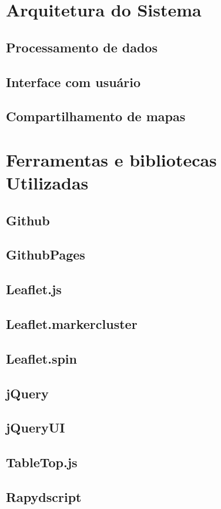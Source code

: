 \section{Arquitetura do Sistema}
\subsection{Processamento de dados}
\subsection{Interface com usuário} 
\subsection{Compartilhamento de mapas}

\section{Ferramentas e bibliotecas Utilizadas}
\subsection{Github}
\subsection{GithubPages}

\subsection{Leaflet.js}
\subsection{Leaflet.markercluster}
\subsection{Leaflet.spin}

\subsection{jQuery}
\subsection{jQueryUI}

\subsection{TableTop.js}

\subsection{Rapydscript}